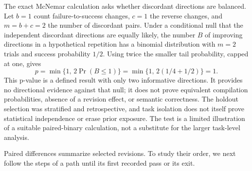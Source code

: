 The exact McNemar calculation asks whether discordant directions are balanced\cite{nistmcnemar}. Let $b=1$ count failure-to-success changes, $c=1$ the reverse changes, and $m=b+c=2$ the number of discordant pairs. Under a conditional null that the independent discordant directions are equally likely, the number $B$ of improving directions in a hypothetical repetition has a binomial distribution with $m=2$ trials and success probability $1/2$. Using twice the smaller tail probability, capped at one, gives
\[
p=\min\{1,\,2\Pr(B\leq1)\}
=\min\{1,\,2(1/4+1/2)\}=1.
\]
This p-value is a defined result with only two informative directions. It provides no directional evidence against that null; it does not prove equivalent compilation probabilities, absence of a revision effect, or semantic correctness. The holdout selection was stratified and retrospective, and task isolation does not itself prove statistical independence or erase prior exposure. The test is a limited illustration of a suitable paired-binary calculation, not a substitute for the larger task-level analysis.

Paired differences summarize selected revisions. To study their order, we next follow the steps of a path until its first recorded pass or its exit.